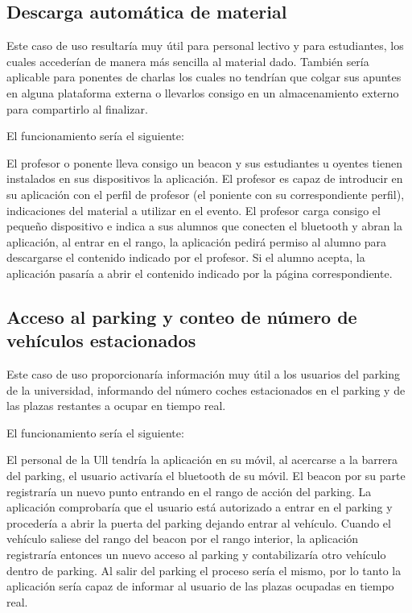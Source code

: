 \subsection{Descarga automática de material}

Este caso de uso resultaría muy útil para personal lectivo y para estudiantes, los cuales accederían de manera más sencilla al material dado. También sería aplicable para ponentes de charlas los cuales no tendrían que colgar sus apuntes en alguna plataforma externa o llevarlos consigo en  un almacenamiento externo para compartirlo al finalizar.

El funcionamiento sería el siguiente: 

El profesor o ponente lleva consigo un beacon y sus estudiantes u oyentes tienen instalados en sus dispositivos la aplicación. El profesor es capaz de introducir en su aplicación con el perfil de profesor (el poniente con su correspondiente perfil), indicaciones del material a utilizar en el evento. El profesor carga consigo el pequeño dispositivo e indica a sus alumnos que conecten el bluetooth y abran la aplicación, al entrar en el rango, la aplicación pedirá permiso al alumno para descargarse el contenido indicado por el profesor. Si el alumno acepta, la aplicación pasaría a abrir  el contenido indicado por la página correspondiente.


\subsection{Acceso al parking y conteo de número de vehículos estacionados}


Este caso de uso proporcionaría información muy útil a los usuarios del parking de la universidad, informando del número coches estacionados en el parking y de las plazas restantes a ocupar en tiempo real.

El funcionamiento sería el siguiente: 

El personal de la Ull tendría la aplicación en su móvil, al acercarse a la barrera del parking, el usuario activaría el bluetooth de su móvil. El beacon por su parte registraría un nuevo punto entrando en el rango de acción del parking. La aplicación comprobaría que el usuario está autorizado a entrar en el parking y procedería a abrir la puerta del parking dejando entrar al vehículo. Cuando el vehículo saliese del rango del beacon por el rango interior, la aplicación registraría entonces un nuevo acceso al parking y contabilizaría otro vehículo dentro de parking. Al salir del parking el proceso sería el mismo, por lo tanto la aplicación sería capaz de informar al usuario de las plazas ocupadas en tiempo real.


